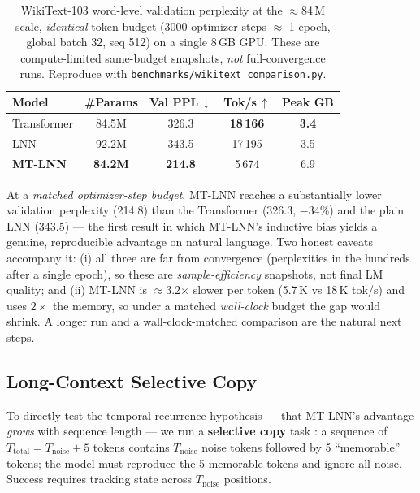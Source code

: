 \documentclass[11pt]{article}
\theoremstyle{definition}
\begin{document}
\begin{table}[h]
\centering
\caption{WikiText-103 word-level validation perplexity at the $\approx$84\,M scale, \emph{identical} token budget (3000 optimizer steps $\approx$ 1 epoch, global batch 32, seq 512) on a single 8\,GB GPU. These are compute-limited same-budget snapshots, \emph{not} full-convergence runs. Reproduce with \texttt{benchmarks/wikitext\_comparison.py}.}
\label{tab:lm}
\begin{tabular}{lcccc}
\toprule
Model & \#Params & Val PPL\,$\downarrow$ & Tok/s\,$\uparrow$ & Peak GB \\
\midrule
Transformer  & 84.5M & 326.3 & \textbf{18\,166} & \textbf{3.4} \\
LNN          & 92.2M & 343.5 & 17\,195 & 3.5 \\
\textbf{MT-LNN} & \textbf{84.2M} & \textbf{214.8} & 5\,674 & 6.9 \\
\bottomrule
\end{tabular}
\end{table}

At a \emph{matched optimizer-step budget}, MT-LNN reaches a substantially lower validation perplexity (214.8) than the Transformer (326.3, $-$34\%) and the plain LNN (343.5) — the first result in which MT-LNN's inductive bias yields a genuine, reproducible advantage on natural language. Two honest caveats accompany it: (i) all three are far from convergence (perplexities in the hundreds after a single epoch), so these are \emph{sample-efficiency} snapshots, not final LM quality; and (ii) MT-LNN is $\approx$3.2$\times$ slower per token (5.7\,K vs 18\,K tok/s) and uses $2\times$ the memory, so under a matched \emph{wall-clock} budget the gap would shrink. A longer run and a wall-clock-matched comparison are the natural next steps.

\subsection{Long-Context Selective Copy}
\label{sec:long_context}

To directly test the temporal-recurrence hypothesis — that MT-LNN's advantage \emph{grows} with sequence length — we run a \textbf{selective copy} task \citep{arjovsky2016unitary}: a sequence of $T_\text{total} = T_\text{noise} + 5$ tokens contains $T_\text{noise}$ noise tokens followed by 5 ``memorable'' tokens; the model must reproduce the 5 memorable tokens and ignore all noise. Success requires tracking state across $T_\text{noise}$ positions.
\end{document}
